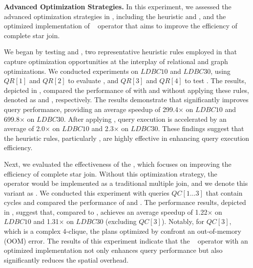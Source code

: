 \noindent\textbf{Advanced Optimization Strategies.}
In this experiment, we assessed the advanced optimization strategies in \name, including the heuristic \filterrule and \joinfuserule, and the optimized implementation of \expandintersect~ operator that aims to improve the efficiency of complete star join.

We began by testing \filterrule and \joinfuserule, two representative heuristic rules employed in \name that capture optimization opportunities at the interplay of relational and graph optimizations. We conducted experiments on $LDBC10$ and $LDBC30$, using $QR[1]$ and $QR[2]$ to evaluate \filterrule, and $QR[3]$ and $QR[4]$ to test \joinfuserule. The results, depicted in , compared the performance of \name with and without applying these rules, denoted as \name and \relgonofi, respectively.
The results demonstrate that \filterrule significantly improves query performance, providing an average speedup of 299.4$\times$ on $LDBC10$ and 699.8$\times$ on $LDBC30$. After applying \joinfuserule, query execution is accelerated by an average of 2.0$\times$ on $LDBC10$ and 2.3$\times$ on $LDBC30$. These findings suggest that the heuristic rules, particularly \filterrule, are highly effective in enhancing query execution efficiency.


Next, we evaluated the effectiveness of the \expandintersect, which focuses on improving the efficiency of complete star join. Without this optimization strategy, the \expandintersect~ operator would be implemented as a traditional multiple join, and we denote this variant as \relgomj. We conducted this experiment with queries $QC[1 \ldots 3]$ that contain cycles and compared the performance of \name and \relgomj.
The performance results, depicted in , suggest that, compared to \relgomj, \name achieves an average speedup of 1.22$\times$ on $LDBC10$ and 1.31$\times$ on $LDBC30$ (excluding $QC[3]$). Notably, for $QC[3]$, which is a complex 4-clique, the plans optimized by \relgomj confront an out-of-memory (OOM) error. %
The results of this experiment indicate that the \expandintersect~ operator with an optimized implementation not only enhances query performance but also significantly reduces the spatial overhead.

